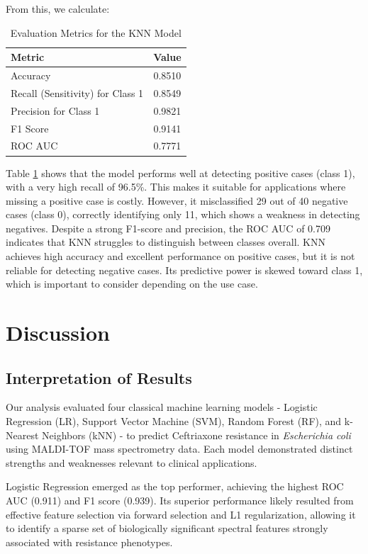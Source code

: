 \documentclass{article}
\begin{document}
From this, we calculate:

\begin{table}[h!]
\centering
\caption{Evaluation Metrics for the KNN Model}
\label{tab:evaluation_metrics_class1}
\begin{tabular}{|l|c|}
\hline
\textbf{Metric} & \textbf{Value} \\
\hline
Accuracy  & 0.8510 \\
Recall (Sensitivity) for Class 1 & 0.8549 \\
Precision for Class 1 & 0.9821 \\
F1 Score  & 0.9141 \\
ROC AUC   & 0.7771 \\
\hline
\end{tabular}
\end{table}

Table \ref{tab:evaluation_metrics_class1} shows that the model performs well at detecting positive cases (class 1), with a very high recall of 96.5\%. This makes it suitable for applications where missing a positive case is costly.
However, it misclassified 29 out of 40 negative cases (class 0), correctly identifying only 11, which shows a weakness in detecting negatives.
Despite a strong F1-score and precision, the ROC AUC of 0.709 indicates that KNN struggles to distinguish between classes overall.
KNN achieves high accuracy and excellent performance on positive cases, but it is not reliable for detecting negative cases. Its predictive power is skewed toward class 1, which is important to consider depending on the use case. \citep{ibm-knn}


\section{Discussion}

\subsection{Interpretation of Results}

Our analysis evaluated four classical machine learning models - Logistic Regression (LR), Support Vector Machine (SVM), Random Forest (RF), and k-Nearest Neighbors (kNN) - to predict Ceftriaxone resistance in \textit{Escherichia coli} using MALDI-TOF mass spectrometry data. Each model demonstrated distinct strengths and weaknesses relevant to clinical applications.

Logistic Regression emerged as the top performer, achieving the highest ROC AUC (0.911) and F1 score (0.939). Its superior performance likely resulted from effective feature selection via forward selection and L1 regularization, allowing it to identify a sparse set of biologically significant spectral features strongly associated with resistance phenotypes.
\end{document}
